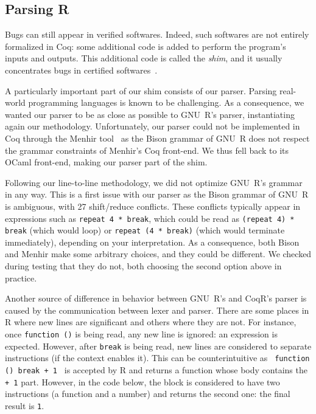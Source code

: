 \documentclass[
    sigplan,
    10pt,
    review, %
    natbib=false %
 ]{acmart}
\begin{document}
\subsection{Parsing R}
\label{sec:shim}

Bugs can still appear in verified softwares.
Indeed, such softwares are not entirely formalized in Coq:
some additional code is added to perform the program's inputs and outputs.
This additional code is called the \emph{shim},
and it usually concentrates bugs in certified softwares~\parencite{Yang:2011:FUB:1993498.1993532}.

A particularly important part of our shim consists of our parser.
Parsing real-world programming languages is known to be challenging.
As a consequence, we wanted our parser to be as close as possible to GNU~R's parser,
instantiating again our methodology.
Unfortunately, our parser could not be implemented in Coq
through the Menhir tool~\parencite{jourdan2012validating}
as the Bison grammar of GNU~R does not respect the grammar constraints
of Menhir's Coq front-end.
We thus fell back to its OCaml front-end,
making our parser part of the shim.

Following our line-to-line methodology,
we did not optimize GNU~R's grammar in any way.
This is a first issue with our parser
as the Bison grammar of GNU~R is ambiguous,
with 27 shift/reduce conflicts.
These conflicts typically appear in expressions such as
\texttt{repeat 4 * break},
which could be read as \texttt{(repeat 4) * break}
(which would loop)
or \texttt{repeat (4 * break)}
(which would terminate immediately),
depending on your interpretation.
As a consequence, both Bison and Menhir make some arbitrary choices,
and they could be different.
We checked during testing that they do not,
both choosing the second option above in practice.

Another source of difference in behavior
between GNU~R's and CoqR's parser
is caused by the communication between lexer and parser.
There are some places in R where new lines are significant
and others where they are not.
For instance, once \texttt{function ()} is being read,
any new line is ignored:
an expression is expected.
However, after \texttt{break} is being read,
new lines are considered to separate instructions
(if the context enables it).
This can be counterintuitive
as \texttt{{ function () break + 1 }}
is accepted by R and returns a function
whose body contains the \texttt{+ 1} part.
However, in the code below,
the block is considered to have two instructions
(a function and a number) and returns the second one:
the final result is \texttt{1}.
\end{document}
